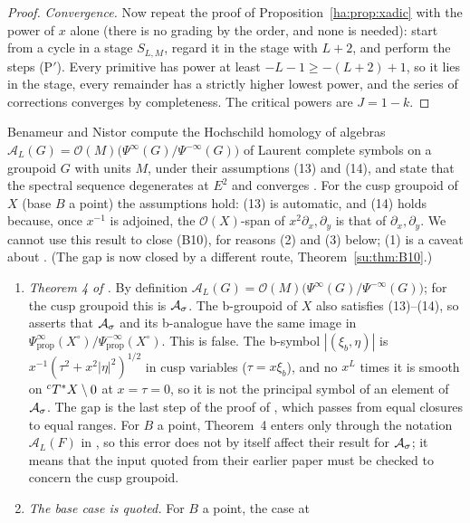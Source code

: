 \begin{proof}
\emph{Convergence.} Now repeat the proof of
Proposition~\ref{ha:prop:xadic} with the power of \(x\) alone (there is no
grading by the order, and none is needed): start from a cycle in a stage
\(S_{L,M}\), regard it in the stage with \(L+2\), and perform the steps
(P\('\)). Every primitive has power at least \(-L-1\ge-(L+2)+1\), so it
lies in the stage, every remainder has a strictly higher lowest power,
and the series of corrections converges by completeness. The critical
powers are \(J=1-k\).
\end{proof}

\begin{remark}\label{ha:rem:BN}
Benameur and Nistor \cite{BN} compute the Hochschild homology of algebras
\(\mathcal A_L(G)=\mathcal O(M)\bigl(\Psi^\infty(G)/\Psi^{-\infty}(G)
\bigr)\) of Laurent complete symbols on a groupoid \(G\) with units \(M\),
under their assumptions (13) and (14), and state that the spectral
sequence degenerates at \(E^2\) and converges \cite[Thm.~6, Lemma~8]{BN}.
For the cusp groupoid of \(X\) (base \(B\) a point) the assumptions hold:
(13) is automatic, and (14) holds because, once \(x^{-1}\) is adjoined,
the \(\mathcal O(X)\)-span of \(x^2\partial_x,\partial_y\) is that of
\(\partial_x,\partial_y\). We cannot use this result to close (B10), for
reasons (2) and (3) below; (1) is a caveat about \cite{BN}. (The gap is
now closed by a different route, Theorem~\ref{su:thm:B10}.)
\begin{enumerate}
\item \emph{Theorem 4 of \cite{BN}.} By definition
\(\mathcal A_L(G)=\mathcal O(M)\bigl(\Psi^\infty(G)/\Psi^{-\infty}(G)\bigr)\);
for the cusp groupoid this is \(\mathcal A_\sigma\). The b-groupoid of \(X\) also
satisfies (13)--(14), so \cite[Thm.~4]{BN} asserts that \(\mathcal A_\sigma\) and its
b-analogue have the same image in
\(\Psi^\infty_{\mathrm{prop}}(X^\circ)/\Psi^{-\infty}_{\mathrm{prop}}(X^\circ)\).
This is false. The b-symbol \(|(\xi_b,\eta)|\) is
\(x^{-1}(\tau^2+x^2|\eta|^2)^{1/2}\) in cusp variables (\(\tau=x\xi_b\)),
and no \(x^L\) times it is smooth on \({}^cT^*X\setminus0\) at \(x=\tau=0\), so
it is not the principal symbol of an element of \(\mathcal A_\sigma\). The gap is the
last step of the proof of \cite[Thm.~4]{BN}, which passes from equal
closures to equal ranges. For \(B\) a point, Theorem~4 enters \cite{BN}
only through the notation \(\mathcal A_L(F)\) in \cite[Lemma~7]{BN}, so this
error does not by itself affect their result for \(\mathcal A_\sigma\); it means that
the input quoted from their earlier paper must be checked to concern the
cusp groupoid.
\item \emph{The base case is quoted.} For \(B\) a point, the case at

\end{enumerate}
\end{remark}
